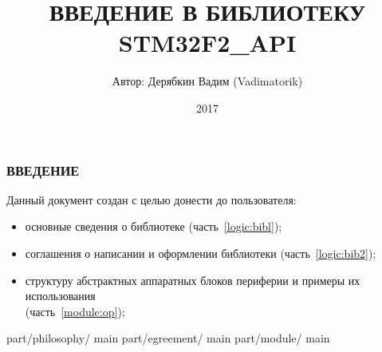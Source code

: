 \documentclass[a4paper, 12pt]{report}		%
\begin{document}
	\title {ВВЕДЕНИЕ В БИБЛИОТЕКУ STM32F2\_API}			%
	\author {Автор: Дерябкин Вадим (Vadimatorik)}
	\date {2017}
	\maketitle

\subsubsection{ВВЕДЕНИЕ}
Данный документ создан с целью донести до пользователя:
\begin{itemize}
	\item основные сведения о библиотеке (часть~\ref{logic:bibl});
	\item соглашения о написании и оформлении библиотеки (часть~\ref{logic:bib2});
	\item структуру абстрактных аппаратных блоков периферии и примеры их использования\\(часть~\ref{module:op});
\end{itemize}

\tableofcontents						%
\clearpage								%

 {part/philosophy/}	{main}		%
 {part/egreement/}	{main}		%
 {part/module/}		{main}
\end{document}
